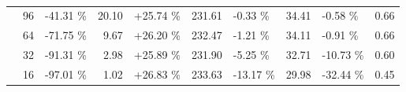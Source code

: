 \begin{table}[]
\begin{tabular}{|c|c|lr|lr|lr|lr|}
                             & 96                                                           & {\color[HTML]{656565} -41.31 \%}                       & 20.10                                             & {\color[HTML]{656565} +25.74 \%}            & 231.61 & {\color[HTML]{656565} -0.33 \%}  & 34.41 & {\color[HTML]{656565} -0.58 \%}  & 0.66 \\ \cline{2-10}
                             & 64                                                           & {\color[HTML]{656565} -71.75 \%}                       & 9.67                                              & {\color[HTML]{656565} +26.20 \%}            & 232.47 & {\color[HTML]{656565} -1.21 \%}  & 34.11 & {\color[HTML]{656565} -0.91 \%}  & 0.66 \\ \cline{2-10} 
                             & 32                                                           & {\color[HTML]{656565} -91.31 \%}                       & 2.98                                              & {\color[HTML]{656565} +25.89 \%}            & 231.90 & {\color[HTML]{656565} -5.25 \%}  & 32.71 & {\color[HTML]{656565} -10.73 \%} & 0.60 \\ \cline{2-10}
                             & 16                                                           & {\color[HTML]{656565} -97.01 \%}                       & 1.02                                              & {\color[HTML]{656565} +26.83 \%}            & 233.63 & {\color[HTML]{656565} -13.17 \%} & 29.98 & {\color[HTML]{656565} -32.44 \%} & 0.45 \\ \hline
    \end{tabular}
    \caption{}
    \label{tab_compute}
\end{table}

